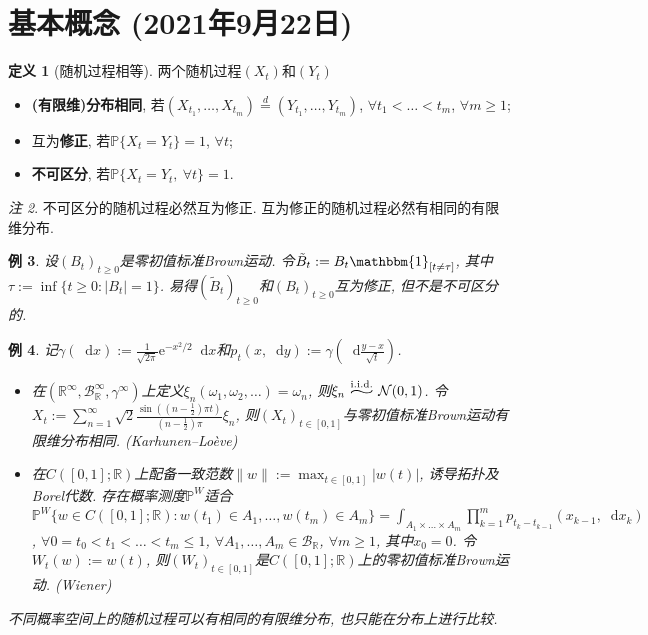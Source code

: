 \documentclass{ctexart}
\theoremstyle{definition}
\newtheorem{Def}{定义}[section]
\theoremstyle{remark}
\newtheorem{Rmk}[Def]{注}
\theoremstyle{plain}
\newtheorem{Eg}[Def]{例}
\newcommand{\widesim}[2][1.5]{\mathrel{\overset{#2}{\scalebox{#1}[1]{$\sim$}}}}
\newcommand{\iidsim}{\widesim[2.33]{\mathrm{i.i.d.}}}	%
\newcommand{\N}{\mathcal{N}}				%
\newcommand{\1}{\mathbbm{1}}				%
\renewcommand{\P}{\mathbb{P}}				%
\newcommand{\abs}[1]{\lvert#1\rvert}			%
\newcommand{\norm}[1]{\lVert#1\rVert}
\newcommand{\R}{\mathbb{R}}					%
\renewcommand*{\d}{\mathop{}\!\mathrm{d}}	%
\newcommand{\e}{\mathrm{e}}
\begin{document}
\section{基本概念 \normalfont\footnotesize (2021年9月22日)}
\begin{Def}[随机过程相等]
两个随机过程$(X_{t})$和$(Y_{t})$
\begin{itemize}
	\item \textbf{(有限维)分布相同}, 若$(X_{t_1},\dots,X_{t_m}) \stackrel{d}{=} (Y_{t_1},\dots,Y_{t_m})$, $\forall t_{1} < \dots < t_{m}$, $\forall m \ge 1$;
	\item 互为\textbf{修正}, 若$\P\{ X_{t} = Y_{t} \} = 1$, $\forall t$;
	\item \textbf{不可区分}, 若$\P\{ X_{t} = Y_{t} , \ \forall t \} = 1$.
\end{itemize}
\end{Def}
\begin{Rmk}
不可区分的随机过程必然互为修正. 互为修正的随机过程必然有相同的有限维分布.
\end{Rmk}

\begin{Eg}
设$(B_{t})_{t \ge 0}$是零初值标准Brown运动. 令$\tilde{B}_{t} := B_{t}\1_{[t\neq\tau]}$, 其中$\tau := \inf\{ t \ge 0 : \abs{B_{t}} = 1 \}$. 易得$(\tilde{B}_{t})_{t \ge 0}$和$(B_{t})_{t \ge 0}$互为修正, 但不是不可区分的.
\end{Eg}

\begin{Eg}
记$\gamma(\d x) := \frac{1}{\sqrt{2\pi}}\e^{-x^{2}/2} \d x$和$p_{t}(x, \d y) := \gamma(\d\frac{y-x}{\sqrt{t}})$.
\begin{itemize}
	\item 在$(\R^{\infty},\mathscr{B}_{\R}^{\infty},\gamma^{\infty})$上定义$\xi_{n}(\omega_{1},\omega_{2},\dots) = \omega_{n}$, 则$\xi_{n} \iidsim \N(0,1)$. 令$X_{t} := \sum_{n=1}^{\infty} \sqrt{2} \frac{\sin((n-\frac{1}{2})\pi t)}{(n-\frac{1}{2})\pi} \xi_{n}$, 则$(X_{t})_{t \in [0,1]}$与零初值标准Brown运动有限维分布相同. \hfill\normalfont (Karhunen--Lo\`{e}ve)
	\item 在$C([0,1];\R)$上配备一致范数$\norm{w} := \max_{t \in [0,1]} \abs{w(t)}$, 诱导拓扑及Borel代数. 存在概率测度$\P^W$适合$\P^{W}\{ w \in C([0,1];\R) : w(t_{1}) \in A_{1} , \dots , w(t_{m}) \in A_{m} \} = \int_{A_{1} \times \dots \times A_{m}} \prod_{k=1}^{m} p_{t_{k}-t_{k-1}}(x_{k-1}, \d x_{k})$, $\forall 0 = t_{0} < t_{1} < \dots < t_{m} \le 1$, $\forall A_{1},\dots,A_{m} \in \mathscr{B}_{\R}$, $\forall m \ge 1$, 其中$x_{0} = 0$. 令$W_{t}(w) := w(t)$, 则$(W_{t})_{t \in [0,1]}$是$C([0,1];\R)$上的零初值标准Brown运动. \hfill\normalfont (Wiener)
\end{itemize}
不同概率空间上的随机过程可以有相同的有限维分布, 也只能在分布上进行比较.
\end{Eg}
\end{document}
